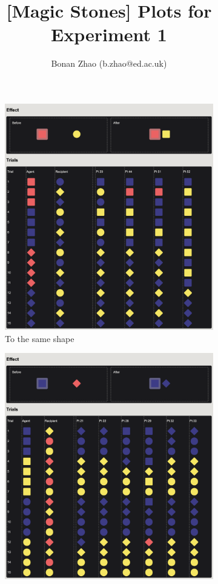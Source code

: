 \documentclass{article}
\title{[Magic Stones] Plots for Experiment 1}
\author{Bonan Zhao (b.zhao@ed.ac.uk)}
\begin{document}
\maketitle


\begin{figure}[h!]
	\centering
  \begin{subfigure}[t]{0.31\textwidth}
  	\centering
  	\includegraphics[width=\linewidth]{raw_g1} 
  	\caption{To the same shape} \label{fig:raw_g1}
  \end{subfigure}
  \hfill
  \begin{subfigure}[t]{0.31\textwidth}
  	\centering
  	\includegraphics[width=\linewidth]{raw_g3} 

\end{subfigure}
\end{figure}
\end{document}
